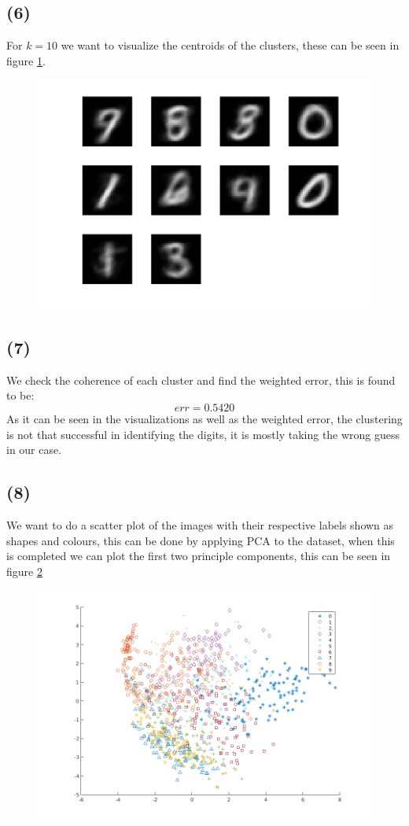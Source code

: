 \documentclass[a4paper]{article}
\begin{document}
\newpage
\subsection*{(6)}
For $k=10$ we want to visualize the centroids of the clusters, these can be seen in figure \ref{opg56}.
\begin{figure}[H]
  \centering
  \includegraphics[width=\textwidth]{./56.png}
  \caption{}
  \label{opg56}
\end{figure}
\subsection*{(7)}
We check the coherence of each cluster and find the weighted error, this is found to be:
\[
err = 0.5420
\]
As it can be seen in the visualizations as well as the weighted error, the clustering is not that successful in identifying the digits, it is mostly taking the wrong guess in our case.
\subsection*{(8)}
We want to do a scatter plot of the images with their respective labels shown as shapes and colours, this can be done by applying PCA to the dataset, when this is completed we can plot the first two principle components, this can be seen in figure \ref{opg58}
\begin{figure}[H]
  \centering
  \includegraphics[width=\textwidth]{./58.png}
  \caption{}
  \label{opg58}
\end{figure}
\end{document}
